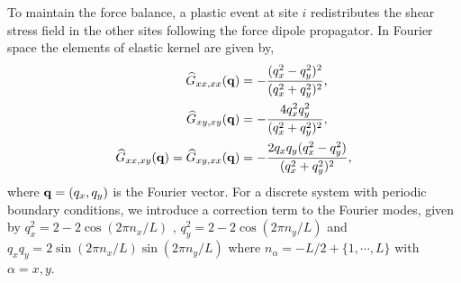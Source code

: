 \documentclass[pre,twocolumn,superscriptaddress,tightenlines,showpacs,longbibliography,floatfix,footinbib]{revtex4-1}
\begin{document}
To maintain the force balance, a plastic event at site $i$ redistributes the shear stress field in the other sites following the force dipole propagator.
In Fourier space the elements of elastic kernel are given by,
\begin{align}
\widehat G_{xx,xx}({\bf q}) &= -\frac{(q_x^2-q_y^2)^2}{(q_x^2+q_y^2)^2} , \\
\widehat G_{xy,xy}({\bf q}) &= -\frac{4 q_x^2 q_y^2}{(q_x^2+q_y^2)^2} , \\
\widehat G_{xx,xy}({\bf q}) = \widehat  G_{xy,xx}({\bf q}) &= - \frac{2q_xq_y (q_x^2-q_y^2)}{(q_x^2+q_y^2)^2} ,
\end{align}
where ${\bf q}=(q_x,q_y)$ is the Fourier vector.
For a discrete system with periodic boundary conditions, we introduce a correction term to the Fourier modes, given by $q_x^2 = 2 - 2\cos{(2\pi n_x / L)}$ , $q_y^2 = 2 - 2\cos{(2\pi n_y / L)}$ and $q_x q_y = 2\sin{(2 \pi n_x /L)} \sin{(2 \pi n_y / L)}$ where $n_\alpha = -L/2 + \lbrace 1 , \cdots , L \rbrace$ with $\alpha=x, y$.




\end{document}
